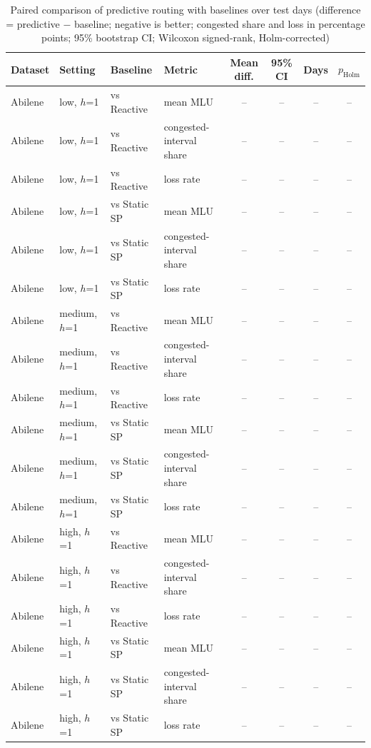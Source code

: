 \begin{table}[t]
\centering
\caption{Paired comparison of predictive routing with baselines over test days (difference = predictive $-$ baseline; negative is better; congested share and loss in percentage points; 95\% bootstrap CI; Wilcoxon signed-rank, Holm-corrected)}
\label{tab:stats}
\scriptsize
\begin{tabular}{@{}llllcccc@{}}
\toprule
Dataset & Setting & Baseline & Metric & Mean diff. & 95\% CI & Days & $p_{\mathrm{Holm}}$ \\
\midrule
Abilene & low, $h$=1 & vs Reactive & mean MLU & -- & -- & -- & -- \\
Abilene & low, $h$=1 & vs Reactive & congested-interval share & -- & -- & -- & -- \\
Abilene & low, $h$=1 & vs Reactive & loss rate & -- & -- & -- & -- \\
Abilene & low, $h$=1 & vs Static SP & mean MLU & -- & -- & -- & -- \\
Abilene & low, $h$=1 & vs Static SP & congested-interval share & -- & -- & -- & -- \\
Abilene & low, $h$=1 & vs Static SP & loss rate & -- & -- & -- & -- \\
Abilene & medium, $h$=1 & vs Reactive & mean MLU & -- & -- & -- & -- \\
Abilene & medium, $h$=1 & vs Reactive & congested-interval share & -- & -- & -- & -- \\
Abilene & medium, $h$=1 & vs Reactive & loss rate & -- & -- & -- & -- \\
Abilene & medium, $h$=1 & vs Static SP & mean MLU & -- & -- & -- & -- \\
Abilene & medium, $h$=1 & vs Static SP & congested-interval share & -- & -- & -- & -- \\
Abilene & medium, $h$=1 & vs Static SP & loss rate & -- & -- & -- & -- \\
Abilene & high, $h$=1 & vs Reactive & mean MLU & -- & -- & -- & -- \\
Abilene & high, $h$=1 & vs Reactive & congested-interval share & -- & -- & -- & -- \\
Abilene & high, $h$=1 & vs Reactive & loss rate & -- & -- & -- & -- \\
Abilene & high, $h$=1 & vs Static SP & mean MLU & -- & -- & -- & -- \\
Abilene & high, $h$=1 & vs Static SP & congested-interval share & -- & -- & -- & -- \\
Abilene & high, $h$=1 & vs Static SP & loss rate & -- & -- & -- & -- \\

\end{tabular}
\end{table}
